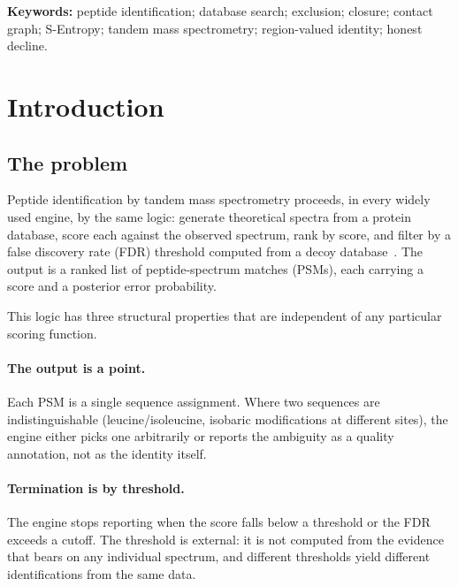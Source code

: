 \documentclass[11pt,a4paper]{article}
\theoremstyle{definition}
\theoremstyle{remark}
\begin{document}
\noindent\textbf{Keywords:} peptide identification; database search;
exclusion; closure; contact graph; S-Entropy; tandem mass spectrometry;
region-valued identity; honest decline.

\tableofcontents
\newpage

\section{Introduction}
\label{sec:intro}

\subsection{The problem}

Peptide identification by tandem mass spectrometry proceeds, in every
widely used engine, by the same logic: generate theoretical spectra from
a protein database, score each against the observed spectrum, rank by
score, and filter by a false discovery rate (FDR) threshold computed
from a decoy
database~\citep{eng1994approach,perkins1999probability,cox2008maxquant,%
elias2007target,kall2007semi,the2016fast}. The output is a ranked list
of peptide-spectrum matches (PSMs), each carrying a score and a
posterior error probability.

This logic has three structural properties that are independent of any
particular scoring function.

\paragraph{The output is a point.} Each PSM is a single sequence
assignment. Where two sequences are indistinguishable (leucine/isoleucine,
isobaric modifications at different sites), the engine either picks one
arbitrarily or reports the ambiguity as a quality annotation, not as the
identity itself.

\paragraph{Termination is by threshold.} The engine stops reporting when
the score falls below a threshold or the FDR exceeds a cutoff. The
threshold is external: it is not computed from the evidence that bears on
any individual spectrum, and different thresholds yield different
identifications from the same data.
\end{document}
